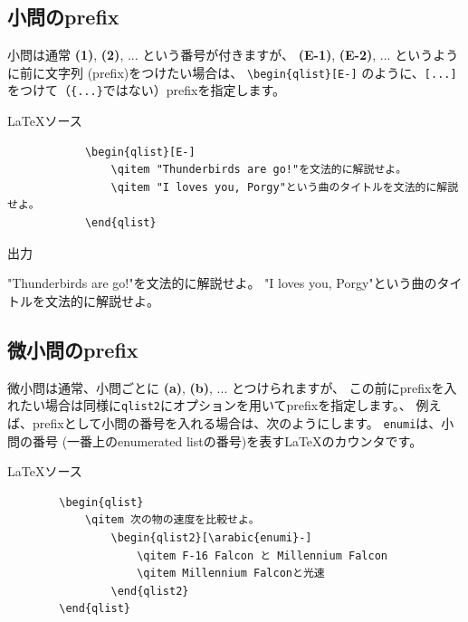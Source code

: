 \documentclass[dvipdfmx,a4j,11pt]{jarticle}
\newenvironment{inputbox}{%
	\begin{itembox}[r]{\LaTeX ソース}
}{
	\end{itembox}
}
\newenvironment{outputbox}{%
	\begin{itembox}[r]{出力}
}{%
	\end{itembox}
}
\begin{document}
\subsection{小問のprefix}
	小問は通常 {\bf (1)}, {\bf (2)}, ... という番号が付きますが、
	{\bf (E-1)}, {\bf (E-2)}, ... というように前に文字列 (prefix)をつけたい場合は、
	{\tt \verb"\begin{qlist}[E-]"} のように、{\tt [...]}をつけて（{\tt \{...\}}ではない）prefixを指定します。
	\begin{inputbox}
		\begin{verbatim}
			\begin{qlist}[E-]
			    \qitem "Thunderbirds are go!"を文法的に解説せよ。
			    \qitem "I loves you, Porgy"という曲のタイトルを文法的に解説せよ。
			\end{qlist}
		\end{verbatim}
	\end{inputbox}
	
	\begin{outputbox}
			\hspace{5mm}
			\begin{minipage}{0.8\linewidth}
			\begin{qlist}[E-]
			    \qitem "Thunderbirds are go!"を文法的に解説せよ。
			    \qitem "I loves you, Porgy"という曲のタイトルを文法的に解説せよ。
			\end{qlist}
			\end{minipage}
	\end{outputbox}
	

\subsection{微小問のprefix}
	微小問は通常、小問ごとに {\bf (a)}, {\bf (b)}, ... とつけられますが、
	この前にprefixを入れたい場合は同様に{\tt qlist2}にオプションを用いてprefixを指定します。、
	例えば、prefixとして小問の番号を入れる場合は、次のようにします。
	{\tt enumi}は、小問の番号 (一番上のenumerated listの番号)を表す\LaTeX のカウンタです。
	
	\begin{inputbox}
		\begin{verbatim}
		\begin{qlist}
		    \qitem 次の物の速度を比較せよ。
		        \begin{qlist2}[\arabic{enumi}-]
		            \qitem F-16 Falcon と Millennium Falcon
		            \qitem Millennium Falconと光速
		        \end{qlist2}
		\end{qlist}
		\end{verbatim}
	\end{inputbox}
	
\end{document}
